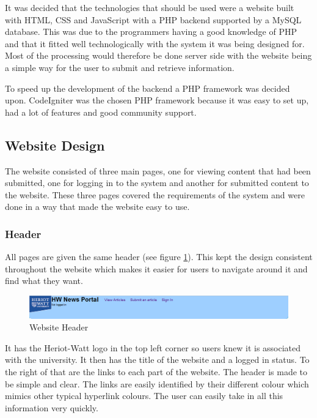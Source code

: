 It was decided that the technologies that should be used were a website built with HTML, CSS and JavaScript with a PHP backend supported by a MySQL database. This was due to the programmers having a good knowledge of PHP and that it fitted well technologically with the system it was being designed for. Most of the processing would therefore be done server side with the website being a simple way for the user to submit and retrieve information.

To speed up the development of the backend a PHP framework was decided upon. CodeIgniter was the chosen PHP framework because it was easy to set up, had a lot of features and good community support.

\subsection{Website Design}
The website consisted of three main pages, one for viewing content that had been submitted, one for logging in to the system and another for submitted content to the website. These three pages covered the requirements of the system and were done in a way that made the website easy to use. 

\subsubsection{Header}
All pages are given the same header (see figure \ref{Website-Header}). This kept the design consistent throughout the website which makes it easier for users to navigate around it and find what they want.

\begin{figure}
\begin{centering}
\includegraphics[width=\textwidth]{Diagrams/Website-Header}
\par\end{centering}

\caption{Website Header}
\label{Website-Header}
\end{figure}

It has the Heriot-Watt logo in the top left corner so users knew it is associated with the university. It then has the title of the website and a logged in status. To the right of that are the links to each part of the website. The header is made to be simple and clear. The links are easily identified by their different colour which mimics other typical hyperlink colours. The user can easily take in all this information very quickly.

